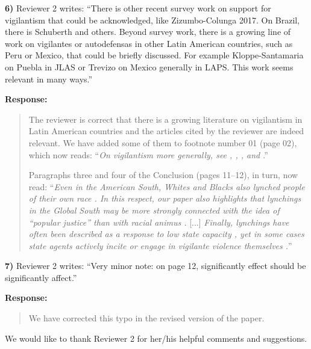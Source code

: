 \documentclass[a4paper,12pt]{article}
\begin{document}
\noindent \textbf{6)} Reviewer 2 writes: ``There is other recent survey work on
support for vigilantism that could be acknowledged, like Zizumbo-Colunga 2017.
On Brazil, there is Schuberth and others. Beyond survey work, there is a
growing line of work on vigilantes or autodefensas in other Latin American
countries, such as Peru or Mexico, that could be briefly discussed. For example
Kloppe-Santamaria on Puebla in JLAS or Trevizo on Mexico generally in LAPS.
This work seems relevant in many ways.''

\vspace{.3cm}

\noindent \textbf{Response:} 
\begin{quote}

The reviewer is correct that there is a growing literature on vigilantism in
Latin American countries and the articles cited by the reviewer are indeed
relevant. We have added some of them to footnote number 01 (page 02), which now
reads: ``\textit{On vigilantism more generally, see
\citet{cohen2022collective}, \citet{schuberth2013challenging},
\citet{smith2019contradictions}, and \citet{zizumbo2017community}}.'' 

Paragraphs three and four of the Conclusion (pages 11--12), in turn, now read:
``\textit{Even in the American South, Whites and Blacks also lynched people of
  their own race \citep{beck1997race}. In this respect, our paper also
  highlights that lynchings in the Global South may be more strongly connected
with the idea of ``popular justice'' than with racial animus
\citep{kloppe2019lynching, martins2015linchamentos}.} [...] \textit{Finally,
lynchings have often been described as a response to low state capacity
\citep{trevizo2022mexico}, yet in some cases state agents actively incite or
engage in vigilante violence themselves \citep{arias2010violent}.}''

\end{quote}

\vspace{.3cm}

\noindent \textbf{7)} Reviewer 2 writes: ``Very minor note: on page 12,
significantly effect should be significantly affect.''

\vspace{.3cm}

\noindent \textbf{Response:} 
\begin{quote}
    We have corrected this typo in the revised version of the paper.
\end{quote}

\vspace{.3cm}

We would like to thank Reviewer 2 for her/his helpful comments and suggestions.



\end{document}
